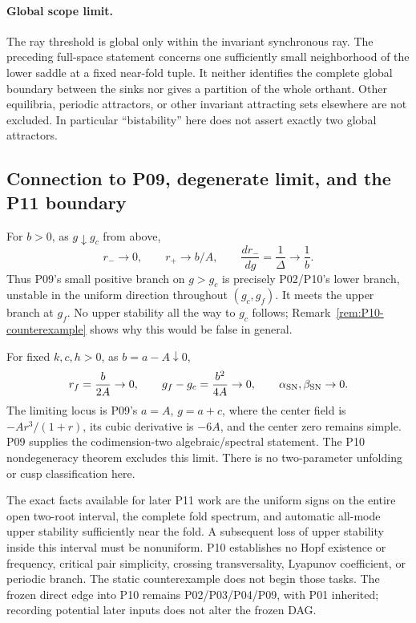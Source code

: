 \paragraph{Global scope limit.}
The ray threshold is global only within the invariant synchronous ray.
The preceding full-space statement concerns one sufficiently small
neighborhood of the lower saddle at a fixed near-fold tuple. It neither
identifies the complete global boundary between the sinks nor gives a
partition of the whole orthant. Other equilibria, periodic attractors,
or other invariant attracting sets elsewhere are not excluded. In
particular ``bistability'' here does not assert exactly two global attractors.

\subsection{Connection to P09, degenerate limit, and the P11 boundary}

For $b>0$, as $g\downarrow g_c$ from above,
\begin{equation}
 r_-\longrightarrow0,\qquad r_+\longrightarrow b/A,
 \qquad \frac{dr_-}{dg}=\frac1\Delta\longrightarrow\frac1b.
 \label{eq:P10-transcritical-connection}
\end{equation}
Thus P09's small positive branch on $g>g_c$ is precisely P02/P10's
lower branch, unstable in the uniform direction throughout
$(g_c,g_f)$. It meets the upper branch at $g_f$. No upper stability
all the way to $g_c$ follows; Remark~\ref{rem:P10-counterexample}
shows why this would be false in general.

For fixed $k,c,h>0$, as $b=a-A\downarrow0$,
\begin{equation}
 r_f=\frac b{2A}\to0,\qquad g_f-g_c=\frac{b^2}{4A}\to0,
 \qquad \alpha_{\rm SN},\beta_{\rm SN}\to0.
 \label{eq:P10-degenerate-limit}
\end{equation}
The limiting locus is P09's $a=A$, $g=a+c$, where the center field
is $-Ar^3/(1+r)$, its cubic derivative is $-6A$, and the center
zero remains simple. P09 supplies the codimension-two algebraic/spectral
statement. The P10 nondegeneracy theorem excludes this limit.
There is no two-parameter unfolding or cusp classification here.

The exact facts available for later P11 work are the uniform signs
on the entire open two-root interval, the complete fold spectrum,
and automatic all-mode upper stability sufficiently near the fold.
A subsequent loss of upper stability inside this interval must be
nonuniform. P10 establishes no Hopf existence or frequency, critical
pair simplicity, crossing transversality, Lyapunov coefficient, or
periodic branch. The static counterexample does not begin those tasks.
The frozen direct edge into P10 remains P02/P03/P04/P09, with P01
inherited; recording potential later inputs does not alter the frozen DAG.
